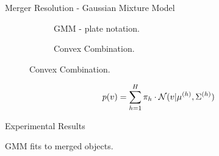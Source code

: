 \begin{frame}{Merger Resolution - Gaussian Mixture Model}
    \begin{figure}
        \centering
        \begin{subfigure}[b]{0.44\textwidth}
            \centering
            \scalebox{0.74}{
                
            }
            \caption{GMM - plate notation.}
        \end{subfigure}
        \hfill
        \begin{subfigure}[b]{0.44\textwidth}
            \centering
            \scalebox{0.65}{
                
            }
            \caption{Convex Combination.}
        \end{subfigure}
        \label{fig:conservation-gmm}
    \end{figure}
    \begin{align*}
        p(v) = \sum_{h=1}^H\pi_h\cdot\mathcal{N}({v}|\mathbf{\mu }^{(h)} , {\Sigma }^{(h)} )
    \end{align*}
\end{frame}



\begin{frame}{Experimental Results}
    \begin{table}
        \centering
        
        \caption{GMM fits to merged objects.}
        \label{tab:conservation-gmm-fits}
    \end{table}
\end{frame}



